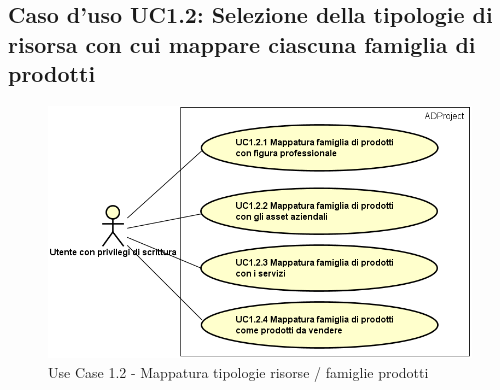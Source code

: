 	\hypertarget{UC1.2}{}
	\subsection{Caso d'uso UC1.2: Selezione della tipologie di risorsa con cui mappare ciascuna famiglia di prodotti}
	
	\begin{figure}[H]
		\centering
		\includegraphics[width=\linewidth]{images/useCase/UC1_2}
		\caption{Use Case 1.2 - Mappatura tipologie risorse / famiglie prodotti}
		\label{fig:uc1.2}
	\end{figure}

